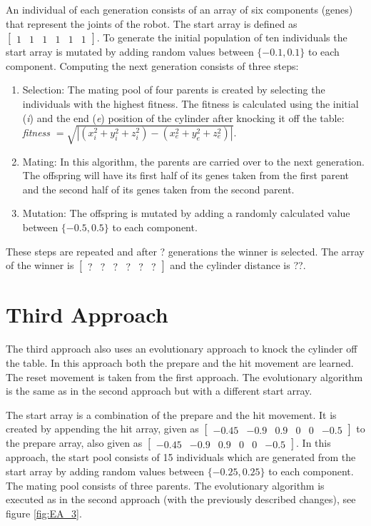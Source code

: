 \documentclass[10pt,twocolumn,letterpaper]{article}
\begin{document}
An individual of each generation consists of an array of six components (genes) that represent the joints of the robot. The start array is defined as $\begin{bmatrix}
				1 & 1 & 1 & 1 & 1 & 1
				\end{bmatrix}$.
To generate the initial population of ten individuals the start array is mutated by adding random values between $\{-0.1,0.1\}$ to each component.
Computing the next generation consists of three steps:
\begin{enumerate}
\item Selection: The mating pool of four parents is created by selecting the individuals with the highest fitness. The fitness is calculated using the initial (\textit{i}) and the end (\textit{e}) position of the cylinder after knocking it off the table: \textit{fitness} $= \sqrt{|(x_i^2+y_i^2+z_i^2)-(x_e^2+y_e^2+z_e^2)|}$.

\item Mating: In this algorithm, the parents are carried over to the next generation. The offspring will have its first half of its genes taken from the first parent and the second half of its genes taken from the second parent. 

\item Mutation: The offspring is mutated by adding a randomly calculated value between $\{-0.5,0.5\}$ to each component.
\end{enumerate}

These steps are repeated and after ? generations the winner is selected. The array of the winner is 
				$\begin{bmatrix}
				? & ? & ? & ? & ? & ?
				\end{bmatrix}$
and the cylinder distance is ??.

\section{Third Approach} \label{sec:thirdApproach}

The third approach also uses an evolutionary approach to knock the cylinder off the table. In this approach both the prepare and the hit movement are learned. The reset movement is taken from the first approach. The evolutionary algorithm is the same as in the second approach but with a different start array. 

The start array is a combination of the prepare and the hit movement. It is  created by appending the hit array, given as  
$\begin{bmatrix}
-0.45 &  -0.9 & 0.9 & 0 & 0 & -0.5
\end{bmatrix}$ 
to the prepare array, also given as
$\begin{bmatrix}
-0.45 &  -0.9 & 0.9 & 0 & 0 & -0.5
\end{bmatrix}$.
In this approach, the start pool consists of 15 individuals which are generated from the start array by adding random values between $\{-0.25,0.25\}$ to each component. The mating pool consists of three parents.
The evolutionary algorithm is executed as in the second approach (with the previously described changes), see figure \ref{fig:EA_3}.
\end{document}

